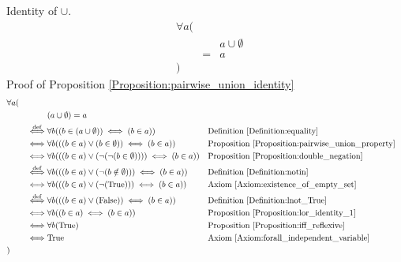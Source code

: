 \begin{prop}
\label{Proposition:pairwise_union_identity}
Identity of $\cup$.
\begin{align*}
& \forall a ( \\
& & & a \cup \emptyset \\
& & = & a \\
& )
\end{align*}
Proof of Proposition \ref{Proposition:pairwise_union_identity}
\begin{align*}
& \forall a ( \\
& & & (a \cup \emptyset) = a \\
& & \overset{\operatorname{def}}{\iff} & \forall b ((b \in (a \cup \emptyset)) \iff (b \in a))
& & \text{Definition \ref{Definition:equality}} \\
& & \iff & \forall b (((b \in a) \lor (b \in \emptyset)) \iff (b \in a))
& & \text{Proposition \ref{Proposition:pairwise_union_property}} \\
& & \iff & \forall b (((b \in a) \lor (\lnot (\lnot (b \in \emptyset)))) \iff (b \in a))
& & \text{Proposition \ref{Proposition:double_negation}} \\
& & \overset{\operatorname{def}}{\iff} & \forall b (((b \in a) \lor (\lnot (b \notin \emptyset))) \iff (b \in a))
& & \text{Definition \ref{Definition:notin}} \\
& & \iff & \forall b (((b \in a) \lor (\lnot (\text{True}))) \iff (b \in a))
& & \text{Axiom \ref{Axiom:existence_of_empty_set}} \\
& & \overset{\operatorname{def}}{\iff} & \forall b (((b \in a) \lor (\text{False})) \iff (b \in a))
& & \text{Definition \ref{Definition:lnot_True}} \\
& & \iff & \forall b ((b \in a) \iff (b \in a))
& & \text{Proposition \ref{Proposition:lor_identity_1}} \\
& & \iff & \forall b (\text{True})
& & \text{Proposition \ref{Proposition:iff_reflexive}} \\
& & \iff & \text{True}
& & \text{Axiom \ref{Axiom:forall_independent_variable}} \\
& )
\end{align*}
\end{prop}

